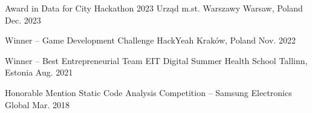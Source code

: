 
\begin{cvhonors}

  \cvhonor
    {Award in Data for City Hackathon 2023}
    {Urząd m.st. Warszawy}
    {Warsaw, Poland}
    {Dec. 2023}

  \cvhonor
    {Winner -- Game Development Challenge}
    {HackYeah}
    {Kraków, Poland}
    {Nov. 2022}

  \cvhonor
    {Winner -- Best Entrepreneurial Team}
    {EIT Digital Summer Health School}
    {Tallinn, Estonia}
    {Aug. 2021}

  \cvhonor
    {Honorable Mention}
    {Static Code Analysis Competition -- Samsung Electronics}
    {Global}
    {Mar. 2018}

\end{cvhonors}
